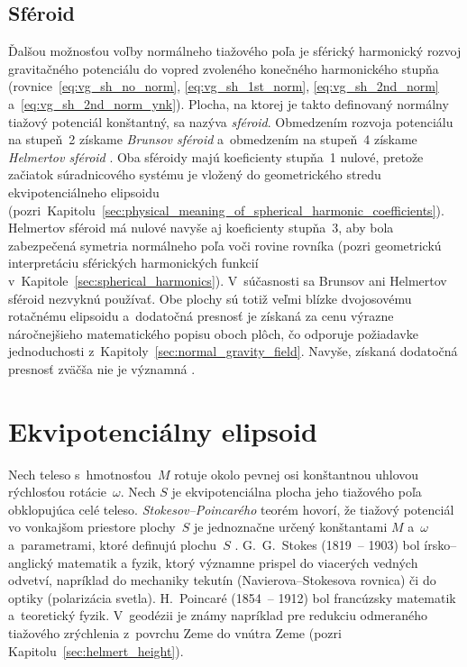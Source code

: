 \documentclass[a4paper, 12pt]{book}
\begin{document}
\subsection{Sféroid}
\label{sec:normal_field_spheroid}

Ďalšou možnosťou voľby normálneho tiažového poľa je sférický harmonický rozvoj 
gravitačného potenciálu do vopred zvoleného konečného harmonického stupňa 
(rovnice~\ref{eq:vg_sh_no_norm}, \ref{eq:vg_sh_1st_norm}, 
\ref{eq:vg_sh_2nd_norm} a~\ref{eq:vg_sh_2nd_norm_ynk}).  Plocha, na ktorej je 
takto definovaný normálny tiažový potenciál konštantný, sa nazýva 
\emph{sféroid}.  Obmedzením rozvoja potenciálu na stupeň~2 získame 
\emph{Brunsov sféroid} a~obmedzením na stupeň~4 získame \emph{Helmertov 
sféroid} \parencite{Moritz1967}.  Oba sféroidy majú koeficienty stupňa~1 
nulové, pretože začiatok súradnicového systému je vložený do geometrického 
stredu ekvipotenciálneho elipsoidu 
(pozri~Kapitolu~\ref{sec:physical_meaning_of_spherical_harmonic_coefficients}).  
Helmertov sféroid má nulové navyše aj koeficienty stupňa~3, aby bola 
zabezpečená symetria normálneho poľa voči rovine rovníka (pozri geometrickú 
interpretáciu sférických harmonických funkcií 
v~Kapitole~\ref{sec:spherical_harmonics}).   V~súčasnosti sa Brunsov ani 
Helmertov sféroid nezvyknú používať.  Obe plochy sú totiž veľmi blízke 
dvojosovému rotačnému elipsoidu a~dodatočná presnosť je získaná za cenu výrazne 
náročnejšieho matematického popisu oboch plôch, čo odporuje požiadavke 
jednoduchosti z~Kapitoly~\ref{sec:normal_gravity_field}.  Navyše, získaná 
dodatočná presnosť zväčša nie je významná \parencite{Moritz1967}.



\section{Ekvipotenciálny elipsoid}
\label{sec:equipotential_ellipsoid}

Nech teleso s~hmotnosťou~$M$ rotuje okolo pevnej osi konštantnou uhlovou 
rýchlosťou rotácie~$\omega$.  Nech $S$ je ekvipotenciálna plocha jeho tiažového 
poľa obklopujúca celé teleso.  \emph{Stokesov--Poincarého} teorém hovorí, že 
tiažový potenciál vo vonkajšom priestore plochy~$S$ je jednoznačne určený 
konštantami $M$ a~$\omega$ a~parametrami, ktoré definujú plochu~$S$ 
\parencite{TorgeGeodesy}.  G.~G.~Stokes (1819~-- 1903) bol írsko--anglický 
matematik a fyzik, ktorý významne prispel do viacerých vedných odvetví, 
napríklad do mechaniky tekutín (Navierova--Stokesova rovnica) či do optiky 
(polarizácia svetla).  H.~Poincaré (1854~-- 1912) bol francúzsky matematik 
a~teoretický fyzik.  V~geodézii je známy napríklad pre redukciu odmeraného 
tiažového zrýchlenia z~povrchu Zeme do vnútra Zeme (pozri 
Kapitolu~\ref{sec:helmert_height}).
\end{document}
